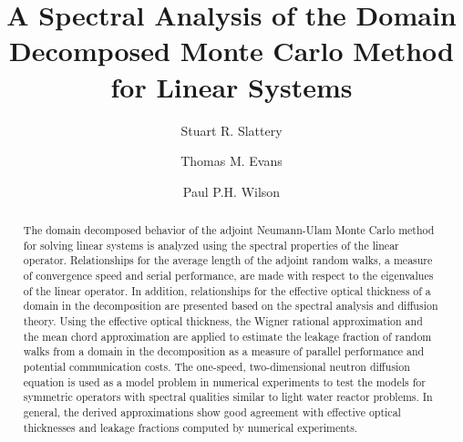 \documentclass[preprint,11pt]{elsarticle}
\begin{document}
\begin{frontmatter}

\title{A Spectral Analysis of the Domain Decomposed Monte Carlo Method for
  Linear Systems}


  \author[ornl]{Stuart R. Slattery}


  \author[ornl]{Thomas M. Evans}


  \author[wisc]{Paul P.H. Wilson}


  \address[ornl]{Oak Ridge National Laboratory, 1 Bethel Valley Rd., Oak
    Ridge, TN 37831, U.S.A.}

  \address[wisc]{University of Wisconsin - Madison, 1500 Engineering Dr.,
    Madison, WI 53706, U.S.A.}

  \begin{abstract}
    The domain decomposed behavior of the adjoint Neumann-Ulam Monte Carlo
    method for solving linear systems is analyzed using the spectral
    properties of the linear operator. Relationships for the average length of
    the adjoint random walks, a measure of convergence speed and serial
    performance, are made with respect to the eigenvalues of the linear
    operator. In addition, relationships for the effective optical thickness
    of a domain in the decomposition are presented based on the spectral
    analysis and diffusion theory. Using the effective optical thickness, the
    Wigner rational approximation and the mean chord approximation are applied
    to estimate the leakage fraction of random walks from a domain in the
    decomposition as a measure of parallel performance and potential
    communication costs. The one-speed, two-dimensional neutron diffusion
    equation is used as a model problem in numerical experiments to test the
    models for symmetric operators with spectral qualities similar to light
    water reactor problems. In general, the derived approximations show good
    agreement with effective optical thicknesses and leakage fractions
    computed by numerical experiments.
\end{abstract}


\end{frontmatter}
\end{document}
